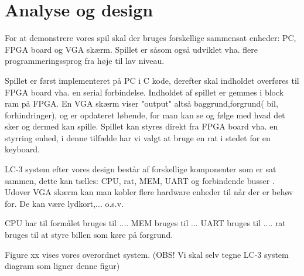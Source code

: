 \chapter{Analyse og design}\label{cha:analysedesign}
For at demonstrere vores spil skal der bruges forskellige sammensat enheder: PC, FPGA board og VGA skærm. Spillet er såsom også udviklet vha. flere programmeringssprog fra høje til lav niveau.

Spillet er først implementeret på PC i C kode, derefter skal indholdet overføres til FPGA board vha. en serial forbindelse. Indholdet af spillet er gemmes i block ram på FPGA. En VGA skærm viser "output" altså baggrund,forgrund( bil, forhindringer), og er opdateret løbende, for man kan se og følge med hvad det sker og dermed kan spille. Spillet kan styres direkt fra FPGA board vha. en styrring enhed, i denne tilfælde har vi valgt at bruge en rat i stedet for en keyboard.

LC-3 system efter vores design består af forskellige komponenter som er sat sammen, dette kan tælles: CPU, rat, MEM, UART og  forbindende busser . Udover VGA skærm kan man kobler flere hardware enheder til når der er behøv for. De kan være lydkort,... o.s.v.

CPU har til formålet bruges til ....
MEM bruges til ...
UART bruges til ....
rat bruges til at styre billen som køre på forgrund.

Figure xx vises vores overordnet system.
(OBS! Vi skal selv tegne LC-3 system diagram som ligner denne figur)

